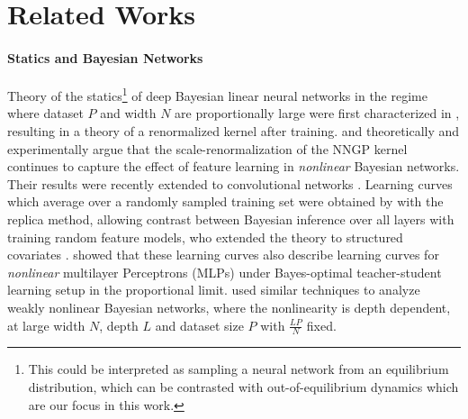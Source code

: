 \section{Related Works}
\label{sec:related_works}
\vspace{-5pt}
\paragraph{Statics and Bayesian Networks} Theory of the statics\footnote{ This could be interpreted as sampling a neural network from an equilibrium distribution, which can be contrasted with out-of-equilibrium dynamics which are our focus in this work. } of deep Bayesian linear neural networks in the regime where dataset $P$ and width $N$ are proportionally large were first characterized in \citet{li2021statistical}, resulting in a theory of a renormalized kernel after training. \citet{pacelli2023statistical} and \citet{baglioni2024predictive} theoretically and experimentally argue that the scale-renormalization of the NNGP kernel continues to capture the effect of feature learning in \textit{nonlinear} Bayesian networks. Their results were recently extended to convolutional networks \cite{aiudi2025local, bassetti2024feature}. Learning curves which average over a randomly sampled training set were obtained by \citet{zavatone2022contrasting} with the replica method, allowing contrast between Bayesian inference over all layers with training random feature models, who extended the theory to structured covariates \cite{zavatoneveth2023learning}. \citet{cui2023bayes} showed that these learning curves also describe learning curves for \textit{nonlinear} multilayer Perceptrons (MLPs) under Bayes-optimal teacher-student learning setup in the proportional limit. \citet{hanin2024bayesian} used similar techniques to analyze weakly nonlinear Bayesian networks, where the nonlinearity is depth dependent, at large width $N$, depth $L$ and dataset size $P$ with $\frac{L P}{N}$ fixed.

\vspace{-10pt}
